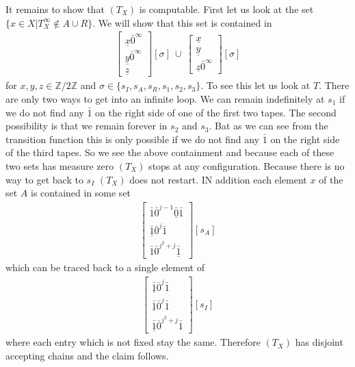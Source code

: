 \documentclass[12pt,a4paper]{scrartcl}
\theoremstyle{plain}
\theoremstyle{definition}
\numberwithin{equation}{section}
\newcommand{\2}{\mathbb{Z} / 2 \mathbb{Z}}
\newcommand{\1}{\bar{1}}
\newcommand{\0}{\bar{0}}
\begin{document}
It remains to show that $(T_X)$ is computable. First let us look at the set $\{x \in X | T_X^\infty \notin A \cup R\}$. We will show that this set is contained in
\begin{align*}
	\begin{bmatrix}
		\underline{x} \0^\infty \\
		\underline{y} \0^\infty \\
		\underline{z}
	\end{bmatrix} [\sigma] \ \cup \
	\begin{bmatrix}
		\underline{x} \\
		\underline{y} \\
		\underline{z} \0^\infty
	\end{bmatrix} [\sigma]
\end{align*} for $x, y, z \in \2$ and $\sigma \in \{s_I, s_A, s_R, s_1, s_2, s_3\}$.
To see this let us look at $T$. There are only two ways to get into an infinite loop. We can remain indefinitely at $s_1$ if we do not find any $\1$ on the right side of one of the first two tapes. The second possibility is that we remain forever in $s_2$ and $s_3$. Bat as we can see from the transition function this is only possible if we do not find any $\1$ on the  right side of the third tapes. So we see the above containment and because each of these two sets has measure zero $(T_X)$ stops at any configuration. 
Because there is no way to get back to $s_I$ $(T_X)$ does not restart. IN addition each element $x$ of the set $A$ is contained in some set
\begin{align*}
	\begin{bmatrix}
		\1 \0^{j - 1} \underline{\0} \1 \\
		\underline{\1} \0^j \1 \\
		\1 \0^{j^2 + j} \underline{\1}
	\end{bmatrix}[s_A]
\end{align*}
which can be traced back to a single element of 
\begin{align*}
	\begin{bmatrix}
		\underline{\1} \0^j \1 \\
		\underline{\1} \0^j \1 \\
		\underline{\1} \0^{j^2 + j} \1
	\end{bmatrix}[s_I]
\end{align*}
where each entry which is not fixed stay the same. Therefore $(T_X)$ has disjoint accepting chains and the claim follows.
  \newpage
\end{document}
